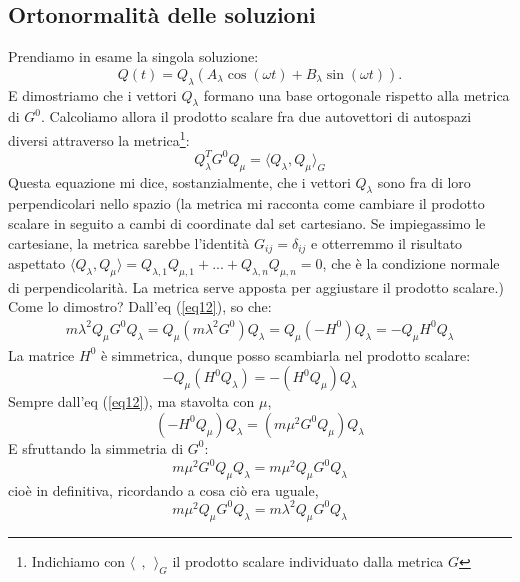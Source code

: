 \documentclass[a4paper,openany]{article}
\begin{document}
	\subsection{Ortonormalità delle soluzioni}
	Prendiamo in esame la singola soluzione:
	$$
	Q(t) = Q_{\lambda}(A_{\lambda}\cos(\omega t)+B_{\lambda}\sin(\omega t)).
	$$
	E dimostriamo che i vettori $Q_{\lambda}$ formano una base ortogonale rispetto alla metrica di $G^{0}$. Calcoliamo allora il prodotto scalare fra due autovettori di autospazi diversi attraverso la metrica\footnote{Indichiamo con $\langle \>\>,\>\>\rangle_{G}$ il prodotto scalare individuato dalla metrica $G$}:
	\begin{equation}\label{key}
		Q_{\lambda}^{T}G^{0}Q_{\mu} = \langle Q_{\lambda},Q_{\mu} \rangle_{G}
	\end{equation}
Questa equazione mi dice, sostanzialmente, che i vettori $Q_{\lambda}$ sono fra di loro perpendicolari nello spazio (la metrica mi racconta come cambiare il prodotto scalare in seguito a cambi di coordinate dal set cartesiano. Se impiegassimo le cartesiane, la metrica sarebbe l'identità $G_{ij} = \delta_{ij}$ e otterremmo il risultato aspettato $\langle Q_{\lambda},Q_{\mu}\rangle = Q_{\lambda,1}Q_{\mu,1}+ ... + Q_{\lambda,n}Q_{\mu,n}=0$, che è la condizione normale di perpendicolarità. La metrica serve apposta per aggiustare il prodotto scalare.)
Come lo dimostro?
Dall'eq (\ref{eq12}), so che:
\begin{equation}
	\begin{aligned}
		m\lambda^2 Q_{\mu} G^0 Q_{\lambda} =  Q_{\mu} (	m\lambda^2G^0) Q_{\lambda} = Q_{\mu}(-H^0)Q_{\lambda} =- Q_{\mu}H^0Q_{\lambda}
	\end{aligned}
\end{equation}
La matrice $H^0$ è simmetrica, dunque posso scambiarla nel prodotto scalare: 
\begin{equation}\label{key}
	-Q_{\mu}(H^0Q_{\lambda}) = -(H^0 Q_{\mu})Q_{\lambda}
\end{equation}
Sempre dall'eq (\ref{eq12}), ma stavolta con $\mu$,
\begin{equation}\label{key}
	(-H^0 Q_{\mu})Q_{\lambda} = (m\mu^2 G^{0}Q_{\mu})Q_{\lambda}
\end{equation}
E sfruttando la simmetria di $G^0$:
\begin{equation}\label{key}
	m\mu^2 G^{0}Q_{\mu}Q_{\lambda} = m\mu^2 Q_{\mu}G^0Q_{\lambda}
\end{equation}
cioè in definitiva, ricordando a cosa ciò era uguale,
$$
m\mu^2 Q_{\mu}G^0Q_{\lambda} = 	m\lambda^2 Q_{\mu} G^0 Q_{\lambda}
$$
\end{document}
